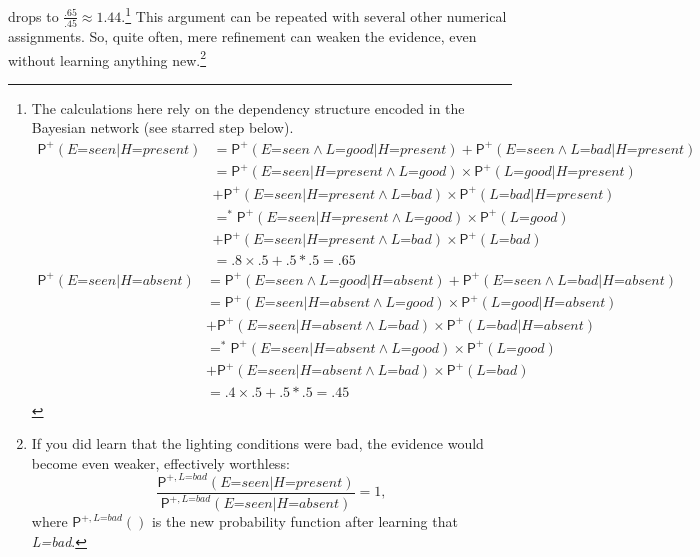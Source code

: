 \documentclass[
  11pt,
  dvipsnames,enabledeprecatedfontcommands]{scrartcl}
\newcommand{\ppr}[2]{\ensuremath{\mathsf{P}^{#1}(#2)}}
\begin{document}
drops to \(\frac{.65}{.45}\approx 1.44\).\footnote{The calculations here
  rely on the dependency structure encoded in the Bayesian network (see
  starred step below). \begin{align*}
  \ppr{+}{\textit{E=seen} \vert \textit{H=present}} &= \ppr{+}{\textit{E=seen} \wedge \textit{L=good} \vert \textit{H=present}}+\ppr{+}{\textit{E=seen} \wedge \textit{L=bad} \vert \textit{H=present}}\\
  &= \ppr{+}{\textit{E=seen} \vert \textit{H=present} \wedge \textit{L=good}}  \times \ppr{+}{\textit{L=good} \vert  \textit{H=present} }\\ & +\ppr{+}{\textit{E=seen}  \vert \textit{H=present} \wedge \textit{L=bad}} \times \ppr{+}{\textit{L=bad} \vert  \textit{H=present}}\\
  &=^* \ppr{+}{\textit{E=seen} \vert \textit{H=present} \wedge \textit{L=good}}  \times \ppr{+}{\textit{L=good}}\\ & +\ppr{+}{\textit{E=seen}  \vert \textit{H=present} \wedge \textit{L=bad}} \times \ppr{+}{\textit{L=bad}}\\
  &= .8 \times .5 +.5 *.5 = .65 
  \end{align*} \begin{align*}
  \ppr{+}{\textit{E=seen} \vert \textit{H=absent}} &= \ppr{+}{\textit{E=seen} \wedge \textit{L=good} \vert \textit{H=absent}}+\ppr{+}{\textit{E=seen} \wedge \textit{L=bad} \vert \textit{H=absent}}\\
  &= \ppr{+}{\textit{E=seen} \vert \textit{H=absent} \wedge \textit{L=good}}  \times \ppr{+}{\textit{L=good} \vert  \textit{H=absent} }\\ & +\ppr{+}{\textit{E=seen}  \vert \textit{H=absent} \wedge \textit{L=bad}} \times \ppr{+}{\textit{L=bad} \vert  \textit{H=absent}}\\
  &=^* \ppr{+}{\textit{E=seen} \vert \textit{H=absent} \wedge \textit{L=good}}  \times \ppr{+}{\textit{L=good}}\\ & +\ppr{+}{\textit{E=seen}  \vert \textit{H=absent} \wedge \textit{L=bad}} \times \ppr{+}{\textit{L=bad}}\\
  &= .4 \times .5 +.5 *.5 = .45 
  \end{align*}} This argument can be repeated with several other
numerical
assignments. So,
quite often, mere refinement can weaken the evidence, even without
learning anything new.\footnote{If you did learn that the lighting
  conditions were bad, the evidence would become even weaker,
  effectively worthless:
  \[\frac{\ppr{+, \textit{L=bad}}{\textit{E=seen} \vert \textit{H=present}}}{\ppr{+, \textit{L=bad}}{\textit{E=seen} \vert \textit{H=absent}}}=1,\]
  where \(\ppr{+, \textit{L=bad}}{}\) is the new probability function
  after learning that \textit{L=bad}.}
\end{document}
